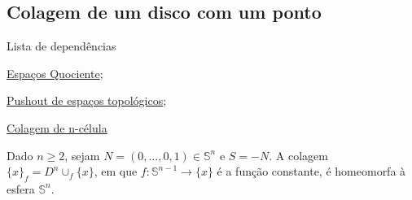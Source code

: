 \subsection{Colagem de um disco com um ponto} %
\label{colagem-de-um-disco-com-um-ponto-ex}
\begin{titlemize}{Lista de dependências}
	\item \hyperref[topologia-quociente-def]{Espaços Quociente};\\
    \item \hyperref[pushout-de-espacos-topologicos-def]{Pushout de espaços topológicos};\\
    \item \hyperref[colagem-de-n-celula-def]{Colagem de n-célula}%
\end{titlemize}

\begin{ex}
    Dado $n\ge 2$, sejam $N = (0,\ldots,0,1) \in \mathbb{S}^n$ e $S = -N$. A colagem $\{x\}_f=D^n\cup_f \{x\}$, em que $f:\mathbb{S}^{n-1}\rightarrow \{x\}$ é a função constante, é homeomorfa à esfera $\mathbb{S}^n$. 
\end{ex}

